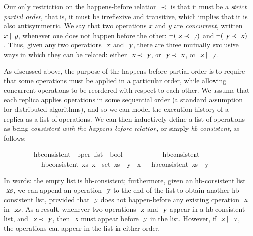 Our only restriction on the happens-before relation $\prec$ is that it must be a \emph{strict partial order}, that is, it must be irreflexive and transitive, which implies that it is also antisymmetric.
We say that two operations $x$ and $y$ are \emph{concurrent}, written $x \mathbin{\emph{$\parallel$}} y$, whenever one does not happen before the other:
$\neg (\isa{x} \prec \isa{y})$ and $\neg (\isa{y} \prec \isa{x})$.
Thus, given any two operations $\isa{x}$ and $\isa{y}$, there are three mutually exclusive ways in which they can be related: either $\isa{x} \prec \isa{y}$, or $\isa{y} \prec \isa{x}$, or $\isa{x} \mathbin{\isasymparallel} \isa{y}$.

As discussed above, the purpose of the happens-before partial order is to require that some operations must be applied in a particular order, while allowing concurrent operations to be reordered with respect to each other.
We assume that each replica applies operations in some sequential order (a standard assumption for distributed algorithms), and so we can model the execution history of a replica as a list of operations.
We can then inductively define a list of operations as being \emph{consistent with the happens-before relation}, or simply \emph{hb-consistent}, as follows:
\vspace{0.375em}
\begin{isabellebody}
\ \ \ \ \ \ \ \  hb{\isacharunderscore}consistent\ {\isacharcolon}{\isacharcolon}\ {\isachardoublequoteopen}{\isacharprime}oper\ list\ {\isasymRightarrow}\ bool{\isachardoublequoteclose}\ \isanewline
\ \ \ \ \ \ \ \ \ \ {\isachardoublequoteopen}hb{\isacharunderscore}consistent\ {\isacharbrackleft}{\isacharbrackright}{\isachardoublequoteclose}\ {\isacharbar}\isanewline
\ \ \ \ \ \ \ \ \ \ {\isachardoublequoteopen}{\isasymlbrakk}\ hb{\isacharunderscore}consistent\ xs{\isacharsemicolon}\ {\isasymforall}x\ {\isasymin}\ set\ xs{\isachardot}\ {\isasymnot}\ y\ {\isasymprec}\ x\ {\isasymrbrakk}\ {\isasymLongrightarrow}\ hb{\isacharunderscore}consistent\ {\isacharparenleft}xs\ {\isacharat}\ {\isacharbrackleft}y{\isacharbrackright}{\isacharparenright}{\isachardoublequoteclose}
\end{isabellebody}
\vspace{0.375em}
In words: the empty list is hb-consistent; furthermore, given an hb-consistent list $\isa{xs}$, we can append an operation $\isa{y}$ to the end of the list to obtain another hb-consistent list, provided that $\isa{y}$ does not happen-before any existing operation $\isa{x}$ in $\isa{xs}$. As a result, whenever two operations $\isa{x}$ and $\isa{y}$ appear in a hb-consistent list, and $\isa{x}\prec\isa{y}$, then $\isa{x}$ must appear before $\isa{y}$ in the list. However, if $\isa{x}\mathbin{\isasymparallel}\isa{y}$, the operations can appear in the list in either order.

